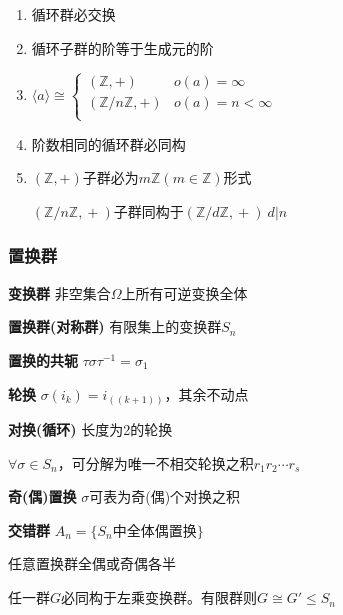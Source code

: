 \documentclass[a4paper,10pt]{ctexart}
\newcommand*{\setZ}{\mathbb{Z}}
\renewcommand*{\leq}{\leqslant}
\newcommand*{\gengroup}[1]{\langle #1 \rangle}
\begin{document}
\begin{multicols}{3}
\begin{theorem}[循环群性质]
        \begin{enumerate}
            \item 循环群必交换
            \item 循环子群的阶等于生成元的阶
            \item $\gengroup{a} \cong \begin{cases}
                          (\setZ, +)        & o(a)=\infty       \\
                          (\setZ/n\setZ, +) & o(a) = n < \infty \\
                      \end{cases}$
            \item 阶数相同的循环群必同构
            \item $(\setZ, +)\!$子群必为$m\setZ(m \!\in\! \setZ)$形式

                  $(\setZ/n\setZ,\! +)\!$子群同构于$\!(\setZ/d\setZ,\! +)\  d|n$
        \end{enumerate}
    \end{theorem}

    \subsubsection{置换群}

    \textbf{变换群} 非空集合$\Omega$上所有可逆变换全体

    \textbf{置换群(对称群)} 有限集上的变换群$S_n$

    \textbf{置换的共轭} $\tau \sigma \tau^{-1} = \sigma_1$

    \textbf{轮换} $\sigma(i_k) = i_{((k+1))}$，其余不动点

    \textbf{对换(循环)} 长度为2的轮换

    \begin{theorem}[标准轮换分解]
        $\forall \sigma \in S_n$，可分解为唯一不相交轮换之积$r_1 r_2 \cdots r_s$
    \end{theorem}

    \textbf{奇(偶)置换} $\sigma$可表为奇(偶)个对换之积

    \textbf{交错群} $A_n = \{ S_n \text{中全体偶置换} \}$

    \begin{theorem}[置换群性质]
        任意置换群全偶或奇偶各半
    \end{theorem}

    \begin{theorem}[Cayley定理]
        任一群$G$必同构于左乘变换群。有限群则$G \!\cong\! G' \!\leq\! S_n$
    \end{theorem}


\end{multicols}
\end{document}
